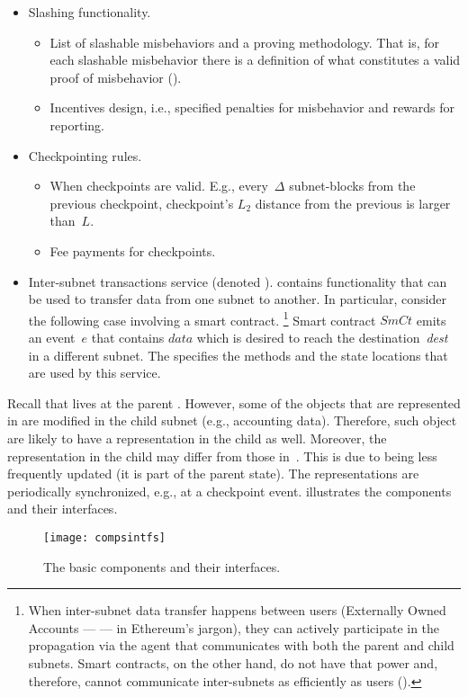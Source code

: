 %
\begin{itemize}
    \item Slashing functionality.
    \begin{itemize}
        \item List of slashable misbehaviors and a proving methodology. That is, for each slashable misbehavior there is a definition of what constitutes a valid proof of misbehavior (\pom).
        \item Incentives design, i.e., specified penalties for misbehavior and rewards for reporting.
    \end{itemize}
    \item Checkpointing rules.
    \begin{itemize}
        \item When checkpoints are valid. E.g., every~$\Delta$ subnet-blocks from the previous checkpoint, checkpoint's $L_2$ distance from the previous is larger than~$L$.
        \item Fee payments for checkpoints.
    \end{itemize}
    \item Inter-subnet transactions service (denoted \postoffice). 
    \sa contains functionality that can be used to transfer data from one subnet to another. In particular, consider the following case involving a smart contract.%
    \footnote{When inter-subnet data transfer happens between users (Externally Owned Accounts --- \eoa --- in Ethereum's jargon), they can actively participate in the propagation via the \nameAbbr agent that communicates with both the parent and child subnets. Smart contracts, on the other hand, do not have that power and, therefore, cannot communicate inter-subnets as efficiently as users (\eoa).}
    Smart contract $\textit{SmCt}$ emits an event~$e$ that contains $\textit{data}$ which is desired to reach the destination~\textit{dest} in a different subnet.
    The \postoffice specifies the methods and the state locations that are used by this service.
\end{itemize}
Recall that \sa lives at the parent \smr. However, some of the objects that are represented in \sa are modified in the child subnet (e.g., accounting data). Therefore, such object are likely to have a representation in the child \smr as well.
Moreover, the representation in the child \smr may differ from those in~\sa. This is due to \sa being less frequently updated (it is part of the parent \smr state). The representations are periodically synchronized, e.g., at a checkpoint event.  illustrates the components and their interfaces.

\begin{figure}[h]
     \centering
     \texttt{[image: compsintfs]}
     \caption{The basic components and their interfaces.}
     \label{fig:interfaces}
 \end{figure}